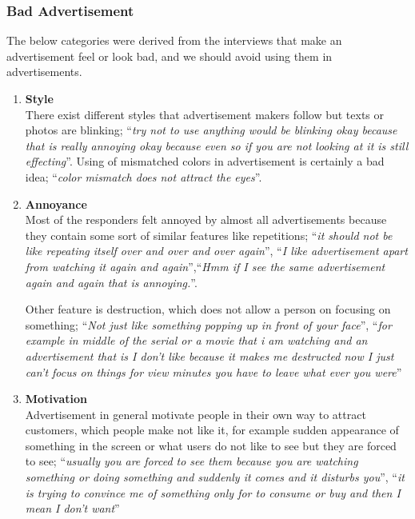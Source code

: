 


\subsubsection{Bad Advertisement}
The below categories were derived from the interviews that make an advertisement feel or look bad, and we should avoid using them in advertisements.

\begin{enumerate}
\item \textbf{Style} \\
There exist different styles that advertisement makers follow but texts or photos are blinking; ``\emph{try not to use anything would be blinking okay because that is really annoying okay because even so if you are not looking at it is still effecting}''. Using of mismatched colors in advertisement is certainly a bad idea; ``\emph{color mismatch does not attract the eyes}''.

\item \textbf{Annoyance} \\
Most of the responders felt annoyed by almost all advertisements because they contain some sort of similar features like repetitions; ``\emph{it should not be like repeating itself over and over and over again}'', ``\emph{I like advertisement apart from watching it again and again}'',``\emph{Hmm if I see the same advertisement again and again that is annoying.}''. 

Other feature is destruction, which does not allow a person on focusing on something; ``\emph{Not just like something popping up in front of your face}'', ``\emph{for example in middle of the serial or a movie that i am watching and an advertisement that is I don't like because it makes me destructed now I just can't focus on things for view minutes you have to leave what ever you were}''

\item \textbf{Motivation} \\
Advertisement in general motivate people in their own way to attract customers, which people make not like it, for example sudden appearance of something in the screen or what users do not like to see but they are forced to see; ``\emph{usually you are forced to see them because you are watching something or doing something and suddenly it comes and it disturbs you}'', ``\emph{it is trying to convince me of something only for to consume or buy and then I mean I don't want}''


\end{enumerate}
